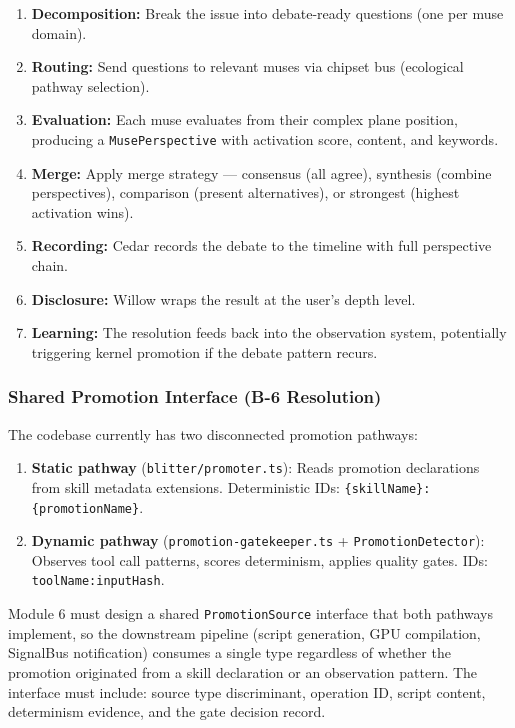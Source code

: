 \documentclass[11pt,letterpaper]{article}
\begin{document}
\begin{enumerate}
\item \textbf{Decomposition:} Break the issue into debate-ready questions (one per muse domain).
\item \textbf{Routing:} Send questions to relevant muses via chipset bus (ecological pathway selection).
\item \textbf{Evaluation:} Each muse evaluates from their complex plane position, producing a \texttt{MusePerspective} with activation score, content, and keywords.
\item \textbf{Merge:} Apply merge strategy --- consensus (all agree), synthesis (combine perspectives), comparison (present alternatives), or strongest (highest activation wins).
\item \textbf{Recording:} Cedar records the debate to the timeline with full perspective chain.
\item \textbf{Disclosure:} Willow wraps the result at the user's depth level.
\item \textbf{Learning:} The resolution feeds back into the observation system, potentially triggering kernel promotion if the debate pattern recurs.
\end{enumerate}

\subsubsection{Shared Promotion Interface (B-6 Resolution)}

The codebase currently has two disconnected promotion pathways:

\begin{enumerate}
\item \textbf{Static pathway} (\texttt{blitter/promoter.ts}): Reads promotion declarations from skill metadata extensions. Deterministic IDs: \texttt{\{skillName\}:\{promotionName\}}.

\item \textbf{Dynamic pathway} (\texttt{promotion-gatekeeper.ts} + \texttt{PromotionDetector}): Observes tool call patterns, scores determinism, applies quality gates. IDs: \texttt{toolName:inputHash}.
\end{enumerate}

Module 6 must design a shared \texttt{PromotionSource} interface that both pathways implement, so the downstream pipeline (script generation, GPU compilation, SignalBus notification) consumes a single type regardless of whether the promotion originated from a skill declaration or an observation pattern. The interface must include: source type discriminant, operation ID, script content, determinism evidence, and the gate decision record.
\end{document}
